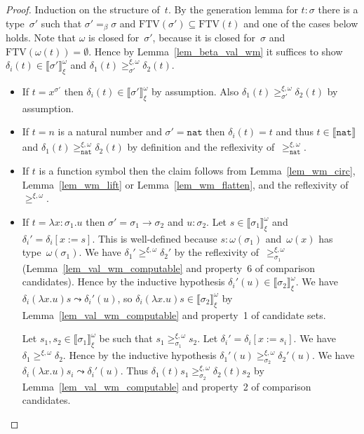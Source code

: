 \documentclass[a4paper,UKenglish,cleveref,autoref,numberwithinsect]{lipics-v2019}
\theoremstyle{definition}
\newcommand{\arrtype}{\rightarrow}
\newcommand{\subst}[2]{#1:=#2}
\newcommand{\abs}[2]{\lambda #1.#2}
\newcommand{\nat}{\mathtt{nat}}
\newcommand{\FTV}{\mathrm{FTV}}
\newcommand{\val}[3]{\ensuremath{\llbracket#1\rrbracket_{#2}^{#3}}}
\newcommand{\gteq}[3]{\ensuremath{\ge_{#1}^{#2,#3}}}
\begin{document}
\begin{proof}
  Induction on the structure of~$t$. By the generation lemma for $t :
  \sigma$ there is a type~$\sigma'$ such that $\sigma' =_\beta \sigma$
  and $\FTV(\sigma') \subseteq \FTV(t)$ and one of the cases below
  holds. Note that $\omega$ is closed for~$\sigma'$, because it is
  closed for~$\sigma$ and $\FTV(\omega(t)) = \emptyset$. Hence by
  Lemma~\ref{lem_beta_val_wm} it suffices to show $\delta_i(t) \in
  \val{\sigma'}{\xi}{\omega}$ and $\delta_1(t)
  \gteq{\sigma'}{\xi}{\omega} \delta_2(t)$.
  \begin{itemize}
  \item If $t = x^{\sigma'}$ then $\delta_i(t) \in
    \val{\sigma'}{\xi}{\omega}$ by assumption. Also $\delta_1(t)
    \gteq{\sigma'}{\xi}{\omega} \delta_2(t)$ by assumption.
  \item If $t = n$ is a natural number and $\sigma' = \nat$ then
    $\delta_i(t) = t$ and thus $t \in \val{\nat}{}{}$ and $\delta_1(t)
    \gteq{\nat}{\xi}{\omega} \delta_2(t)$ by definition and the
    reflexivity of~$\gteq{\nat}{\xi}{\omega}$.
  \item If $t$ is a function symbol then the claim follows from
    Lemma~\ref{lem_wm_circ}, Lemma~\ref{lem_wm_lift} or
    Lemma~\ref{lem_wm_flatten}, and the reflexivity
    of~$\gteq{}{\xi}{\omega}$.
  \item If $t = \abs{x:\sigma_1}{u}$ then $\sigma' =
    \sigma_1\arrtype\sigma_2$ and $u : \sigma_2$. Let $s \in
    \val{\sigma_1}{\xi}{\omega}$ and
    $\delta_i'=\delta_i[\subst{x}{s}]$. This is well-defined because
    $s : \omega(\sigma_1)$ and~$\omega(x)$ has
    type~$\omega(\sigma_1)$. We have $\delta_1' \gteq{}{\xi}{\omega}
    \delta_2'$ by the reflexivity of~$\gteq{\sigma_1}{\xi}{\omega}$
    (Lemma~\ref{lem_val_wm_computable} and property~6 of comparison
    candidates). Hence by the inductive hypothesis $\delta_i'(u) \in
    \val{\sigma_2}{\xi}{\omega}$. We have $\delta_i(\abs{x}{u}) s
    \leadsto \delta_i'(u)$, so $\delta_i(\abs{x}{u}) s \in
    \val{\sigma_2}{\xi}{\omega}$ by Lemma~\ref{lem_val_wm_computable}
    and property~1 of candidate sets.

    Let $s_1,s_2 \in \val{\sigma_1}{\xi}{\omega}$ be such that $s_1
    \gteq{\sigma_1}{\xi}{\omega} s_2$. Let
    $\delta_i'=\delta_i[\subst{x}{s_i}]$. We have $\delta_1
    \gteq{}{\xi}{\omega} \delta_2$. Hence by the inductive hypothesis
    $\delta_1'(u)\gteq{\sigma_2}{\xi}{\omega}\delta_2'(u)$. We have
    $\delta_i(\abs{x}{u}) s_i \leadsto \delta_i'(u)$. Thus
    $\delta_1(t) s_1 \gteq{\sigma_2}{\xi}{\omega} \delta_2(t) s_2$ by
    Lemma~\ref{lem_val_wm_computable} and property~2 of comparison
    candidates.


\end{itemize}
\end{proof}
\end{document}
